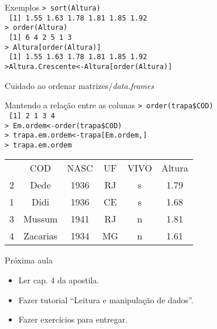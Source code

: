 \documentclass{beamer}
\begin{document}
\begin{frame}{Exemplos}
\texttt{> sort(Altura)\\
~[1] 1.55 1.63 1.78 1.81 1.85 1.92\\ \vspace{10pt} \pause
> order(Altura)\\
~[1] 6 4 2 5 1 3 \\ \vspace{10pt} \pause
> Altura[order(Altura)]\\
~[1] 1.55 1.63 1.78 1.81 1.85 1.92\\
>Altura.Crescente<-Altura[order(Altura)]}  
\end{frame}
\begin{frame}{Cuidado ao ordenar matrizes/\textit{data.frames}}
\centering
{}  
\end{frame}

\begin{frame}{Mantendo a relação entre as colunas}
\texttt{> order(trapa\$COD)\\
~[1] 2 1 3 4\\ \vspace{10pt}
> Em.ordem<-order(trapa\$COD)\\ \pause
> trapa.em.ordem<-trapa[Em.ordem,]\\
> trapa.em.ordem}
 \begin{table}[!h]
\begin{tabular}{cccccc}
      & COD & NASC & UF & VIVO & Altura\\
2 &    Dede & 1936 &  RJ&    s &  1.79\\
1 &    Didi & 1936 & CE &   s &  1.68\\
3 &  Mussum & 1941 & RJ &   n  & 1.81\\
4 &Zacarias  & 1934 & MG &    n &  1.61\\
\end{tabular}
\end{table}
  \end{frame}

  \begin{frame}{Próxima aula}
    \begin{itemize}
    \item Ler cap. 4 da apostila.
    \item  Fazer tutorial ``Leitura e manipulação de dados''.
    \item  Fazer exercícios para entregar.
    \end{itemize}
  \end{frame}
\end{document}
